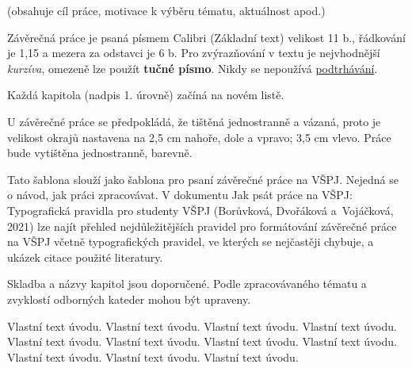 
{\color{infoBlue}
(obsahuje cíl práce, motivace k výběru tématu, aktuálnost apod.)

Závěrečná práce je psaná písmem Calibri (Základní text) velikost 11 b., řádkování je 1,15 a mezera za odstavci je 6 b. Pro zvýrazňování v textu je nejvhodnější \textit{kurzíva}, omezeně lze použít \textbf{tučné písmo}. Nikdy se nepoužívá \underline{podtrhávání}.

Každá kapitola (nadpis 1. úrovně) začíná na novém listě.

U závěrečné práce se předpokládá, že tištěná jednostranně a vázaná, proto je velikost okrajů nastavena na 2,5 cm nahoře, dole a vpravo; 3,5 cm vlevo. Práce bude vytištěna jednostranně, barevně. 

Tato šablona slouží jako šablona pro psaní závěrečné práce na VŠPJ. Nejedná se o návod, jak práci zpracovávat. V dokumentu Jak psát práce na VŠPJ: Typografická pravidla pro studenty VŠPJ (Borůvková, Dvořáková a~Vojáčková, 2021) lze najít přehled nejdůležitějších pravidel pro formátování závěrečné práce na VŠPJ včetně typografických pravidel, ve kterých se nejčastěji chybuje, a ukázek citace použité literatury.

Skladba a názvy kapitol jsou doporučené. Podle zpracovávaného tématu a zvyklostí odborných kateder mohou být upraveny.
}

Vlastní text úvodu. Vlastní text úvodu. Vlastní text úvodu. Vlastní text úvodu. Vlastní text úvodu. Vlastní text úvodu. Vlastní text úvodu. Vlastní text úvodu. Vlastní text úvodu. Vlastní text úvodu. Vlastní text úvodu.

\pagebreak
